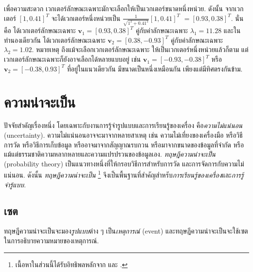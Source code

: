 เพื่อความสะดวก เวกเตอร์ลักษณะเฉพาะมักจะเลือกให้เป็นเวกเตอร์ขนาดหนึ่งหน่วย.
ดังนั้น จากเวกเตอร์ $[1, 0.41]^T$
จะได้เวกเตอร์หนึ่งหน่วยเป็น
$\frac{1}{\sqrt{1^2 + 0.41^2}} [1, 0.41]^T$ $=[0.93, 0.38]^T$.
นั่นคือ
ได้เวกเตอร์ลักษณะเฉพาะ
$\bm{v}_1 = [0.93, 0.38]^T$
คู่กับค่าลักษณะเฉพาะ $\lambda_1 = 11.28$
และในทำนองเดียวกัน
ได้เวกเตอร์ลักษณะเฉพาะ
$\bm{v}_2 = [0.38, -0.93]^T$
คู่กับค่าลักษณะเฉพาะ $\lambda_2 = 1.02$.
หมายเหตุ ถึงแม้จะเลือกเวกเตอร์ลักษณะเฉพาะ ให้เป็นเวกเตอร์หนึ่งหน่วยแล้วก็ตาม
แต่เวกเตอร์ลักษณะเฉพาะก็ยังอาจเลือกได้หลายแบบอยู่ เช่น 
$\bm{v}_1 = [-0.93, -0.38]^T$
หรือ
$\bm{v}_2 = [-0.38, 0.93]^T$
ที่อยู่ในแนวเดียวกัน มีขนาดเป็นหนึ่งเหมือนกัน เพียงแต่มีทิศตรงกันข้าม.

\section{ความน่าจะเป็น}
\label{sec: probability}

ปัจจัยสำคัญเรื่องหนึ่ง โดยเฉพาะกับงานการรู้จำรูปแบบและการเรียนรู้ของเครื่อง
คือ\textit{ความไม่แน่นอน} (uncertainty).
ความไม่แน่นอนอาจจะมาจากหลายสาเหตุ เช่น ความไม่เที่ยงของเครื่องมือ หรือวิธีการวัด หรือวิธีการเก็บข้อมูล หรืออาจมาจากสัญญาณรบกวน หรือมาจากขนาดของข้อมูลที่จำกัด หรือแม้แต่ธรรมชาติความหลากหลายและความแปรปรวนของข้อมูลเอง.
\textit{ทฤษฎีความน่าจะเป็น} (probability theory) 
เป็นแนวทางหนึ่งที่ให้กรอบวิธีการสำหรับการวัด
และการจัดการกับความไม่แน่นอน.
ดังนั้น
\textit{ทฤษฎีความน่าจะเป็น}%
\footnote{%
เนื้อหาในส่วนนี้ได้รับอิทธิพลหลักจาก \cite{Bishop2006a} \cite{Eisenstein2019}
\cite{Murphy2012}
และ \cite{GrimmettStirzaker2001a}.
}
%
จึงเป็นพื้นฐานที่สำคัญสำหรับ\textit{การเรียนรู้ของเครื่อง}และ\textit{การรู้จำรู้แบบ}.

\subsection{เซต}
\label{sec: sets}
 

ทฤษฎีความน่าจะเป็นจะมอง\textit{รูปแบบ}ต่าง ๆ เป็น\textit{เหตุการณ์} (event)
และทฤษฎีความน่าจะเป็นจะใช้เซตในการอธิบายความหมายของเหตุการณ์.

